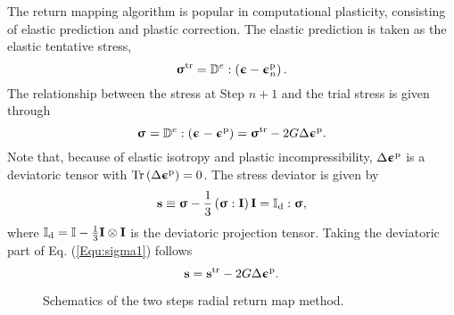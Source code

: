 \documentclass[preprint,5p,twocolumn,11pt,sort&compress]{elsarticle}
\newcommand{\bfsigma}{{\bm{\upsigma}}}
\newcommand{\bfepsilon}{{\bm{\upepsilon}}}
\newcommand{\bfs}{{\bf s}}
\begin{document}
The return mapping algorithm is popular in computational plasticity, consisting of elastic prediction and plastic correction. The elastic prediction is taken as the elastic tentative stress,
\begin{equation}
{\bfsigma}^{\rm tr} = {\mathbb{D}^e}:\left( {{\bfepsilon} - \bfepsilon_n^{\rm p}} \right).
\end{equation}
The relationship between the stress at Step $n+1$  and the trial stress is given through
\begin{equation}
\label{Equ:sigma1}
{{\bfsigma}^{} = {\mathbb{D}^e}:\left( {\bfepsilon^{} - \bfepsilon^{\rm p}} \right)} = {\bfsigma}^{\rm tr} - 2G\Delta \bfepsilon^{\rm p}.
\end{equation}
Note that, because of elastic isotropy and plastic incompressibility, $\Delta \bfepsilon^{\rm p}$ is a deviatoric tensor with ${\rm Tr}\left( {\Delta \bfepsilon^{\rm p}} \right)=0$.
The stress deviator is given by
\begin{equation}
\bfs \equiv {\bfsigma} - \frac{1}{3}\left( {{\bfsigma}:{\mathbf{I}}} \right){\mathbf{I}} = {\mathbb{I}_{\rm d}}:{\bfsigma},
\end{equation}
where ${\mathbb{I}_{\rm d}} = \mathbb{I} - \frac{1}{3}{\mathbf{I}} \otimes {\mathbf{I}}$ is the deviatoric projection tensor.
Taking the deviatoric part of Eq. (\ref{Equ:sigma1}) follows
\begin{equation}\label{Equ:sminusa1}
{\bfs} = \bfs^{\rm tr} - 2G\Delta \bfepsilon^{\rm p}.
\end{equation}

\begin{figure}[!htp]
\caption{Schematics of the two steps radial return map method.}
\label{Fig:radial_return_map}
\end{figure}
\end{document}
